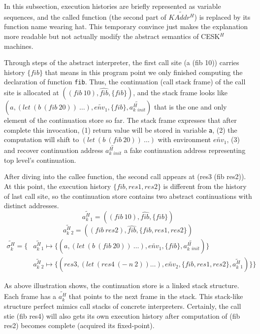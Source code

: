 \documentclass{article}
\begin{document}
In this subsection, execution histories are briefly represented as variable sequences, and the called function (the second part of $\widetilde{KAddr^H}$) is replaced by its function name wearing hat. This temporary convince just makes the explanation more readable but not actually modify the abstract semantics of CESK$^H$ machines.

Through steps of the abstract interpreter, the first call site (a (fib 10)) carries history $\{fib\}$ that means in this program point we only finished computing the declaration of function \verb|fib|.
Thus, the continuation (call stack frame) of the call site is allocated at $((fib\ 10), \widehat{fib}, \{fib\})$, and the stack frame looks like $(a, (let\ (b\ (fib\ 20))\ \dots), \widetilde{env_1}, \{fib\}, \widetilde{a^H_k{}_{init}})$ that is the one and only element of the continuation store so far.
The stack frame expresses that after complete this invocation,
(1) return value will be stored in variable \verb|a|,
(2) the computation will shift to $(let\ (b\ (fib\ 20))\ \dots)$ with environment $\widetilde{env_1}$,
(3) and recover continuation address $\widetilde{a^H_k{}_{init}}$ a fake continuation address representing top level's continuation.

After diving into the callee function, the second call appears at (res3 (fib res2)). At this point, the execution history $\{fib, res1, res2\}$ is different from the history of last call site, so the continuation store contains two abstract continuations with distinct addresses.
\[
\widetilde{a^H_k{}_1} = ((fib\ 10), \widehat{fib}, \{fib\})
\]
\[
\widetilde{a^H_k{}_2} = ((fib\ res2), \widehat{fib}, \{fib, res1, res2\})
\]
\[
\begin{aligned}
\label{eq:show-stack}
\widetilde{\sigma_k^H} = \{ {}& \widetilde{a^H_k{}_1} \mapsto \{(a, (let\ (b\ (fib\ 20))\ \dots), \widetilde{env_1}, \{fib\}, \widetilde{a^H_k{}_{init}})\}  {} \\
                              & \widetilde{a^H_k{}_2} \mapsto \{(res3, (let\ (res4\ (-\ n\ 2)) \dots), \widetilde{env_2}, \{fib, res1, res2\}, \widetilde{a^H_k{}_1})\} \}
\end{aligned}
\]

As above illustration shows, the continuation store is a linked stack structure. Each frame has a $\widetilde{a^H_k}$ that points to the next frame in the stack. This stack-like structure perfect mimics call stacks of concrete interpreters. Certainly, the call stie (fib res4) will also gets its own execution history after computation of (fib res2) becomes complete (acquired its fixed-point).
\end{document}
